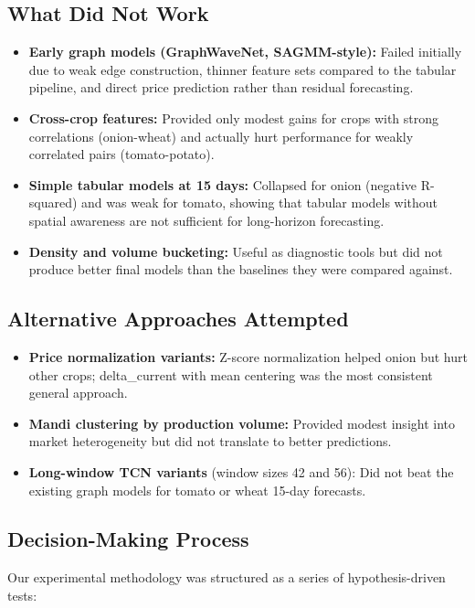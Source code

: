\documentclass[conference]{IEEEtran}
\begin{document}
\subsection{What Did Not Work}

\begin{itemize}
\item \textbf{Early graph models (GraphWaveNet, SAGMM-style):} Failed initially due to weak edge construction, thinner feature sets compared to the tabular pipeline, and direct price prediction rather than residual forecasting.
\item \textbf{Cross-crop features:} Provided only modest gains for crops with strong correlations (onion-wheat) and actually hurt performance for weakly correlated pairs (tomato-potato).
\item \textbf{Simple tabular models at 15 days:} Collapsed for onion (negative R-squared) and was weak for tomato, showing that tabular models without spatial awareness are not sufficient for long-horizon forecasting.
\item \textbf{Density and volume bucketing:} Useful as diagnostic tools but did not produce better final models than the baselines they were compared against.
\end{itemize}

\subsection{Alternative Approaches Attempted}

\begin{itemize}
\item \textbf{Price normalization variants:} Z-score normalization helped onion but hurt other crops; delta\_current with mean centering was the most consistent general approach.
\item \textbf{Mandi clustering by production volume:} Provided modest insight into market heterogeneity but did not translate to better predictions.
\item \textbf{Long-window TCN variants} (window sizes 42 and 56): Did not beat the existing graph models for tomato or wheat 15-day forecasts.
\end{itemize}

\subsection{Decision-Making Process}

Our experimental methodology was structured as a series of hypothesis-driven tests:
\end{document}
